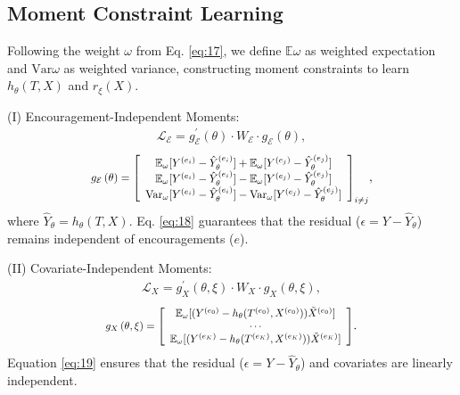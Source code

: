 \documentclass[journal]{IEEEtran}
\newcommand*{\Scale}[2][4]{\scalebox{#1}{$#2$}}
\begin{document}
\subsection{Moment Constraint Learning}
Following the weight $\omega$ from Eq. \eqref{eq:17}, we define $\mathbb{E}{\omega}$ as weighted expectation and $\text{Var}{\omega}$ as weighted variance, constructing moment constraints to learn $h_\theta(T, X)$ and $r_\xi(X)$. 


(I) Encouragement-Independent Moments:
\begin{eqnarray} \label{eq:18}
\mathcal{L}_{\mathcal{E}} =  g_{\mathcal{E}}^{\prime}\left(\theta\right) \cdot W_{\mathcal{E}} \cdot g_{\mathcal{E}}\left(\theta\right), 
\end{eqnarray}
\vspace{-16pt}
\begin{eqnarray}
\Scale[0.88]{
g_{\mathcal{E}}\left(\theta\right) = 
\left[\begin{array}{c}
\mathbb{E}_{\omega}[Y^{(e_i)} - \hat{Y}_{\theta}^{(e_i)}]  +
\mathbb{E}_{\omega}[Y^{(e_j)} - \hat{Y}_{\theta}^{(e_j)}]  \\
\mathbb{E}_{\omega}[Y^{(e_i)} - \hat{Y}_{\theta}^{(e_i)}]  -
\mathbb{E}_{\omega}[Y^{(e_j)} - \hat{Y}_{\theta}^{(e_j)}] 
\\
\operatorname{Var}_{\omega}[Y^{(e_i)} - \hat{Y}_{\theta}^{(e_i)}]  -
\operatorname{Var}_{\omega}[Y^{(e_j)} - \hat{Y}_{\theta}^{(e_j)}]
\end{array}\right]_{i \not= j}}, \nonumber
\end{eqnarray}
where $\hat{Y}_{\theta} = h_{\theta}(T,X)$. Eq. \eqref{eq:18} guarantees that the residual ($\epsilon = Y - \hat{Y}_\theta$) remains independent of encouragements ($e$).

(II) Covariate-Independent Moments:
\begin{eqnarray} \label{eq:19}
\mathcal{L}_{X} =  g_X^\prime\left(\theta, \xi\right) \cdot W_X \cdot g_X\left(\theta, \xi\right),
\end{eqnarray}
\vspace{-16pt}
\begin{eqnarray}
\Scale[0.85]{
g_X\left(\theta, \xi\right)=\left[\begin{array}{c}
\mathbb{E}_{\omega}[({Y}^{(e_0)} - h_{\theta}( T^{(e_0)}, X^{(e_0)})) \tilde{X}^{(e_0)}] \\
\cdots \\
\mathbb{E}_{\omega}[({Y}^{(e_K)} - h_{\theta}( T^{(e_K)}, X^{(e_K)})) \tilde{X}^{(e_K)}]
\end{array}\right]
}.
\nonumber
\end{eqnarray}
Equation \eqref{eq:19} ensures that the residual ($\epsilon = Y - \hat{Y}_\theta$) and covariates are linearly independent.
\end{document}
